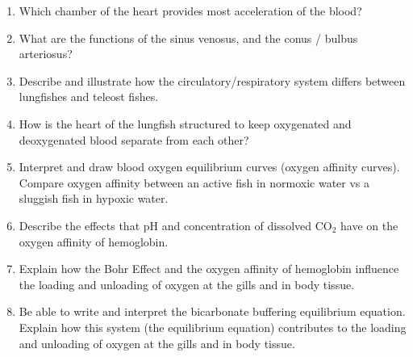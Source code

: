 \documentclass[nofonts, letterpaper]{tufte-handout}
\begin{document}
\begin{enumerate}
	\item Which chamber of the heart provides most acceleration of the blood? 

	\item What are the functions of the sinus venosus, and the conus / bulbus arteriosus?
	
	\item Describe and illustrate how the circulatory/respiratory system differs between lungfishes and teleost fishes.
	
	\item How is the heart of the lungfish structured to keep oxygenated and deoxygenated blood separate from each other?
	
	\item Interpret and draw blood oxygen equilibrium curves (oxygen affinity curves).  Compare oxygen affinity between an active fish in normoxic water vs a sluggish fish in hypoxic water.
	
	\item Describe the effects that pH and concentration of dissolved CO$_2$ have on the oxygen affinity of hemoglobin.
	
	\item Explain how the Bohr Effect and the oxygen affinity of hemoglobin influence the loading and unloading of oxygen at the gills and in body tissue.
	
	\item Be able to write and interpret the bicarbonate buffering equilibrium equation. Explain how this system (the equilibrium equation) contributes to the loading and unloading of oxygen at the gills and in body tissue.  
\end{enumerate}
\end{document}
